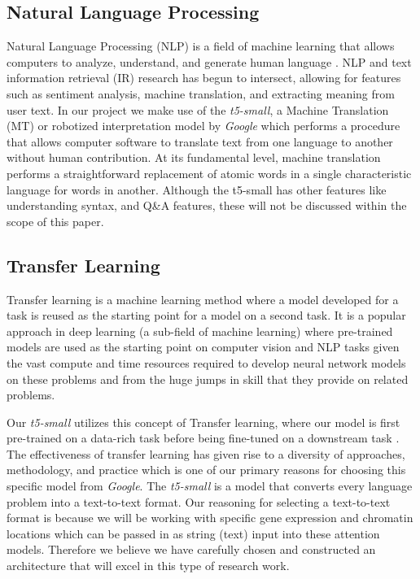 \subsection{Natural Language Processing}

Natural Language Processing (NLP) is a field of machine learning that allows computers to analyze, understand, and generate human language \cite{three}. 
NLP and text information retrieval (IR) research has begun to intersect, allowing for features such as sentiment analysis, machine translation, and extracting meaning from user text. 
In our project we make use of the \emph{t5-small}, a Machine Translation (MT) or robotized interpretation model by \emph{Google} which performs a procedure that allows computer software to translate text from one language to another without human contribution. 
At its fundamental level, machine translation performs a straightforward replacement of atomic words in a single characteristic language for words in another. 
Although the t5-small has other features like understanding syntax, and Q\&A features, these will not be discussed within the scope of this paper.

\subsection{Transfer Learning}
Transfer learning is a machine learning method where a model developed for a task is reused as the starting point for a model on a second task. 
It is a popular approach in deep learning (a sub-field of machine learning) where pre-trained models are used as the starting point on computer vision and NLP tasks given the vast compute and time resources required to develop neural network models on these problems and from the huge jumps in skill that they provide on related problems. 

Our \emph{t5-small} utilizes this concept of Transfer learning, where our model is first pre-trained on a data-rich task before being fine-tuned on a downstream task \cite{four}. 
The effectiveness of transfer learning has given rise to a diversity of approaches, methodology, and practice which is one of our primary reasons for choosing this specific model from \emph{Google}. 
The \emph{t5-small} is a model that converts every language problem into a text-to-text format. 
Our reasoning for selecting a text-to-text format is because we will be working with specific gene expression and chromatin locations which can be passed in as string (text) input into these attention models. 
Therefore we believe we have carefully chosen and constructed an architecture that will excel in this type of research work. 

